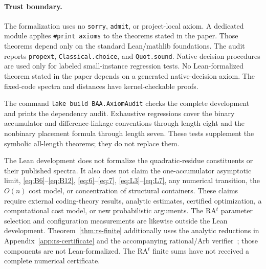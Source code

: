 \paragraph{Trust boundary.}

The formalization uses no \texttt{sorry}, \texttt{admit}, or project-local
axiom.  A dedicated module applies \texttt{\#print axioms} to the theorems
stated in the paper.  Those theorems depend only on the standard Lean/mathlib
foundations.  The audit reports \texttt{propext},
\texttt{Classical.choice}, and \texttt{Quot.sound}.  Native decision procedures
are used only for labeled small-instance regression tests.  No Lean-formalized theorem stated
in the paper depends on a generated native-decision axiom.  The fixed-code
spectra and distances have kernel-checkable proofs.

The command \texttt{lake build BAA.AxiomAudit} checks
the complete development and prints the dependency audit.  Exhaustive
regressions cover the binary accumulator and difference-linkage conventions
through length eight and the nonbinary placement formula through length seven.
These tests supplement the symbolic all-length theorems; they do not replace
them.

The Lean development does not formalize the quadratic-residue constituents or
their published spectra.  It also does not claim the one-accumulator asymptotic
limit, \eqref{eq:B6}--\eqref{eq:B12}, \eqref{eq:6}--\eqref{eq:7},
\eqref{eq:L3}--\eqref{eq:L7}, any numerical transition, the $O(n)$
 cost model, or concentration of structural containers.  These claims require
 external coding-theory results, analytic estimates, certified optimization, a
 computational cost model, or new probabilistic arguments.  The RA$^t$
 parameter selection and configuration measurements are likewise outside the Lean development.
 Theorem~\ref{thm:rs-finite} additionally uses the analytic reductions in
 Appendix~\ref{app:rs-certificate} and the accompanying rational/Arb
 verifier~\cite{chosenbaaartifact}; those components are not Lean-formalized.
 The RA$^t$ finite sums have not received a complete numerical certificate.


